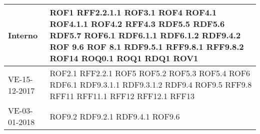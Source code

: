 \documentclass[../AnalisideiRequisiti.tex]{subfiles}
\begin{document}
\begin{longtable}{| p{4cm} | p{4cm} |}
		\newline Interno &  \newline ROF1 \newline RFF2.2.1.1 \newline ROF3.1 \newline ROF4 \newline ROF4.1  \newline ROF4.1.1  \newline ROF4.2  \newline RFF4.3 \newline RDF5.5  \newline RDF5.6  \newline RDF5.7 \newline ROF6.1 \newline RDF6.1.1 \newline RDF6.1.2 \newline RDF9.4.2 \newline ROF 9.6  \newline ROF 8.1  \newline RDF9.5.1  \newline RFF9.8.1  \newline RFF9.8.2 \newline ROF14 \newline ROQ0.1 \newline ROQ1 \newline RDQ1  \newline ROV1 \\[1em]
	\hline
		\newline  VE-15-12-2017 & \newline ROF2.1 \newline RFF2.2.1 \newline ROF5 \newline ROF5.2 \newline ROF5.3 \newline ROF5.4 \newline ROF6 \newline RDF6.1 \newline RDF9.3.1.1 \newline RDF9.3.1.2 \newline RDF9.4 \newline ROF9.5 \newline RFF9.8 \newline RFF11 \newline RFF11.1 \newline RFF12 \newline RFF12.1 \newline RFF13 \\[1em]
	\hline
		\newline VE-03-01-2018 & \newline ROF9.2 \newline RDF9.2.1 \newline RDF9.4.1 \newline ROF9.6 \\[1em]


\end{longtable}
\end{document}
